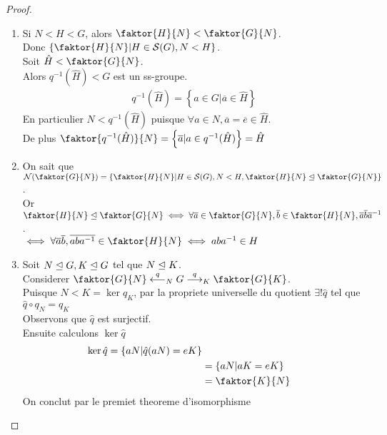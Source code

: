 \documentclass[../main.tex]{subfiles}
\begin{document}
\begin{proof}
\begin{enumerate}
\item Si $ N < H <G$, alors $ \faktor {H} {N} < \faktor {G} {N} $.\\
	Donc $ \left\{ \faktor {H} {  N} | H \in \mathcal{S}( G), N <H \right\} $.\\
	Soit $ \hat{H}< \faktor{G}{N}$.\\
	Alors $ q^{-1}( \hat{H}) < G$ est un ss-groupe.\\
	\begin{align*}
		q^{-1}( \hat{H}) = \left\{ a\in G | \overline{a} \in \hat{H} \right\} 
	\end{align*}
	En particulier $ N< q^{-1}( \hat{H}) $ puisque $\forall a \in N, \overline{a}= \overline{e}\in \hat{H}$.\\
	De plus $ \faktor{q^{-1}(   \hat{H}) }{N}= \left\{ \overline{a}| a \in q^{-1}( \hat{H})  \right\} =\hat{H}	 $ 

\item On sait que $ \mathcal{N}( \faktor{G}{N}) = \left\{ \faktor{H}{N}| H \in \mathcal{S}( G) , N < H, \faktor{H}{N}\nal \faktor{G}{N} \right\}$.\\
	Or $ \faktor{H}{N}\nal \faktor{G}{N}\iff \forall \overline{a}\in \faktor{G}{N}, \overline{b}\in \faktor{H}{N}, \overline{a}\overline{b}\overline{a}^{-1}$.\\
$\iff \forall \overline{a}\overline{b}, \overline{aba^{-1}}\in \faktor{H}{N} \iff aba^{-1}\in H$
\item Soit $ N\trianglelefteq G, K \trianglelefteq G$ tel que $ N\trianglelefteq K$.\\
	Considerer $ \faktor{G}{N} \oal q_N G \oar q_K \faktor{G}{K}$.\\
	Puisque $ N <K= \ker q_K$, par la propriete universelle du quotient $\exists! \hat{q} $ tel que $\hat{q} \circ q_N = q_K$\\
	Observons que $ \hat{q}$ est surjectif.\\
	Ensuite calculons $\ker \hat{q}$
	\begin{align*}
		\ker \hat{q} = \left\{ aN | \hat{q}( aN) = eK \right\}\\
		&= \left\{ aN | aK = eK \right\}\\
		&= \faktor{K}{N}
	\end{align*}
	On conclut par le premiet theoreme d'isomorphisme
	
\end{enumerate}

\end{proof}
\end{document}

